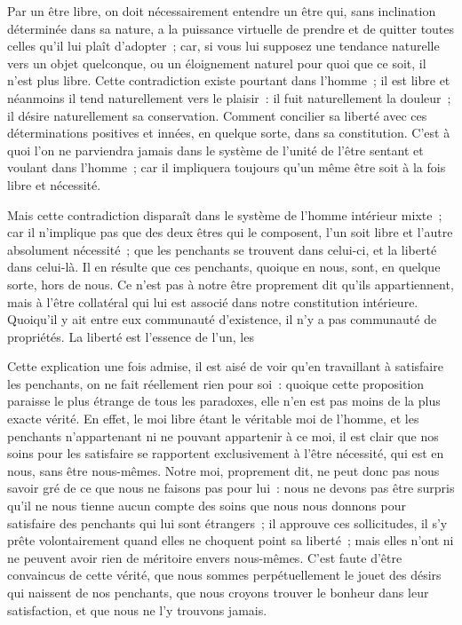 \documentclass[french,twoside]{book} %
\newcommand\chaptercont{} %
\begin{document}
\chaptercont
\noindent Par un être libre, on doit nécessairement entendre un être qui, sans inclination déterminée dans sa nature, a la puissance virtuelle de prendre et de quitter toutes celles qu’il lui plaît d’adopter ; car, si vous lui supposez une tendance naturelle vers un objet quelconque, ou un éloignement naturel pour quoi que ce soit, il n’est plus libre. Cette contradiction existe pourtant dans l’homme ; il est libre et néanmoins il tend naturellement vers le plaisir : il fuit naturellement la douleur ; il désire naturellement sa conservation. Comment concilier sa liberté avec ces déterminations positives et innées, en quelque sorte, dans sa constitution. C’est à quoi l’on ne parviendra jamais dans le système de l’unité de l’être sentant et voulant dans l’homme ; car il impliquera toujours qu’un même être soit à la fois libre et nécessité.\par
Mais cette contradiction disparaît dans le système de l’homme intérieur mixte ; car il n’implique pas que des deux êtres qui le composent, l’un soit libre et l’autre absolument nécessité ; que les penchants se trouvent dans celui-ci, et la liberté dans celui-là. Il en résulte que ces penchants, quoique en nous, sont, en quelque sorte, hors de nous. Ce n’est pas à notre être proprement dit qu’ils appartiennent, mais à l’être collatéral qui lui est associé dans notre constitution intérieure. Quoiqu’il y ait entre eux communauté d’existence, il n’y a pas communauté de propriétés. La liberté est l’essence de l’un, les\par
Cette explication une fois admise, il est aisé de voir qu’en travaillant à satisfaire les penchants, on ne fait réellement rien pour soi : quoique cette proposition paraisse le plus étrange de tous les paradoxes, elle n’en est pas moins de la plus exacte vérité. En effet, le moi libre étant le véritable moi de l’homme, et les penchants n’appartenant ni ne pouvant appartenir à ce moi, il est clair que nos soins pour les satisfaire se rapportent exclusivement à l’être nécessité, qui est en nous, sans être nous-mêmes. Notre moi, proprement dit, ne peut donc pas nous savoir gré de ce que nous ne faisons pas pour lui : nous ne devons pas être surpris qu’il ne nous tienne aucun compte des soins que nous nous donnons pour satisfaire des penchants qui lui sont étrangers ; il approuve ces sollicitudes, il s’y prête volontairement quand elles ne choquent point sa liberté ; mais elles n’ont ni ne peuvent avoir rien de méritoire envers nous-mêmes. C’est faute d’être convaincus de cette vérité, que nous sommes perpétuellement le jouet des désirs qui naissent de nos penchants, que nous croyons trouver le bonheur dans leur satisfaction, et que nous ne l’y trouvons jamais.\par
\end{document}
